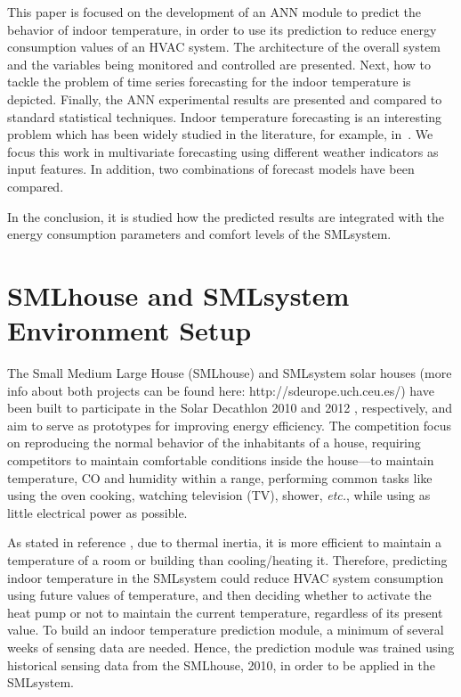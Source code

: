 \documentclass[energies,article,accept,moreauthors,pdftex,12pt,a4paper]{mdpi}
\newcommand{\ann}{ANN\xspace}
\newcommand{\smlhouse}{SMLhouse\xspace}
\newcommand{\smlsystem}{SMLsystem\xspace}
\begin{document}
This paper is focused on the development of an \ann module to predict the behavior
of indoor temperature, in order to use its prediction to reduce energy
consumption values of an HVAC system. The architecture of the
overall system and the variables being monitored and controlled are presented.
Next, how to tackle the problem of time series forecasting for the indoor temperature is
depicted. \linebreak Finally, the \ann experimental results are presented and compared to
standard statistical techniques.
Indoor temperature forecasting is an interesting problem which has been widely
studied in the literature, for example,
in~\cite{2008:EandB:Neto,Ferreira,Alvarez,2012:EandB:olderwurtel,2013:ESA:Mateo}. We
focus this work in multivariate forecasting using different
weather indicators as input features. In addition, two combinations of forecast models have been
compared.

In the conclusion, it is studied how the predicted results are integrated with the energy consumption parameters and comfort levels of the \smlsystem.

\section{\smlhouse and \smlsystem Environment Setup}

The Small Medium Large House (\smlhouse) and \smlsystem solar houses (more info about both projects can be found here: http://sdeurope.uch.ceu.es/)
have been built to participate in the Solar Decathlon 2010 and 2012 \cite{solar}, respectively, and aim to serve as prototypes for improving energy efficiency.
The competition focus on reproducing the normal behavior of the inhabitants of a house, requiring competitors to maintain comfortable conditions inside the house---to maintain temperature, CO and humidity within a range, performing common tasks like using the oven cooking, watching television (TV), shower, {\it etc.}, while using as little electrical power as possible.

As stated in reference
\cite{DBLP:conf/infocom/PanYWXPPW12}, due to thermal inertia, it is more efficient to maintain a temperature of a room or building than cooling/heating it. Therefore, predicting indoor temperature in
the \smlsystem could reduce HVAC system consumption
using future values of temperature, and then deciding whether to activate the
heat pump or not to maintain the current temperature, regardless of its present value. To build an indoor temperature prediction module, a minimum of several weeks of sensing data are needed. Hence, the prediction module was trained using historical sensing data from the \smlhouse, 2010, in order to be applied in the \smlsystem.
\end{document}
